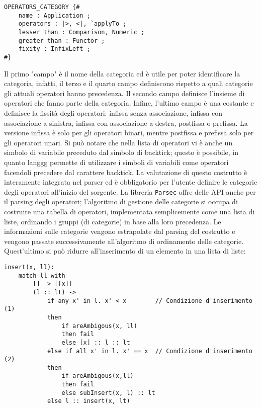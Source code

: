 \documentclass[10pt,a4paper]{article}
\begin{document}
\begin{lstlisting}
OPERATORS_CATEGORY {#
    name : Application ;
    operators : |>, <|, `applyTo ;
    lesser than : Comparison, Numeric ;
    greater than : Functor ;
    fixity : InfixLeft ;
#}
\end{lstlisting}

Il primo "campo" è il nome della categoria ed è utile per poter identificare la categoria, infatti, il terzo e il
quarto campo definiscono rispetto a quali categorie gli attuali operatori hanno precedenza. Il secondo campo definisce
l'insieme di operatori che fanno parte della categoria. Infine, l'ultimo campo è una costante e definisce la fissità
degli operatori: infissa senza associazione, infissa con associazione a sinistra, infissa con associazione a destra,
postfissa o prefissa. La versione infissa è solo per gli operatori binari, mentre postfissa e prefissa solo per gli
operatori unari. Si può notare che nella lista di operatori vi è anche un simbolo di variabile preceduto dal simbolo
di backtick; questo è possibile, in quanto langgg permette di utilizzare i simboli di variabili come operatori
facendoli precedere dal carattere backtick. La valutazione di questo costrutto è interamente integrata nel parser ed
è obbligatorio per l'utente definire le categorie degli operatori all'inizio del sorgente. La libreria \texttt{Parsec}
offre delle API anche per il parsing degli operatori; l'algoritmo di gestione delle categorie si occupa di costruire
una tabella di operatori, implementata semplicemente come una lista di liste, ordinando i gruppi (di categorie) in
base alla loro precedenza. Le informazioni sulle categorie vengono estrapolate dal parsing del costrutto e vengono
passate successivamente all'algoritmo di ordinamento delle categorie. Quest'ultimo si può ridurre all'inserimento
di un elemento in una lista di liste:

\begin{lstlisting}
insert(x, ll):
    match ll with
        [] -> [[x]]
        (l :: lt) ->
            if any x' in l. x' < x        // Condizione d'inserimento (1)
            then
                if areAmbigous(x, ll)
                then fail
                else [x] :: l :: lt
            else if all x' in l. x' == x  // Condizione d'inserimento (2)
            then
                if areAmbigous(x,ll)
                then fail
                else subInsert(x, l) :: lt
            else l :: insert(x, lt)
\end{lstlisting}
\end{document}
